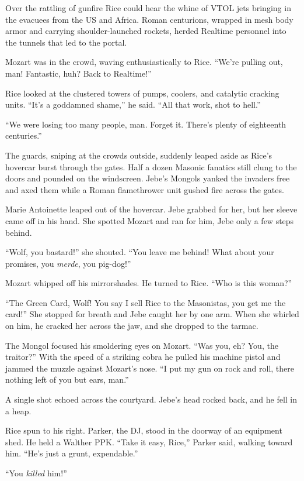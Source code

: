 Over the rattling of gunfire Rice could hear the whine of VTOL jets bringing in the evacuees from the US and Africa. Roman centurions, wrapped in mesh body armor and carrying shoulder-launched rockets, herded Realtime personnel into the tunnels that led to the portal.

Mozart was in the crowd, waving enthusiastically to Rice. ``We're pulling out, man! Fantastic, huh? Back to Realtime!''

Rice looked at the clustered towers of pumps, coolers, and catalytic cracking units. ``It's a goddamned shame,'' he said. ``All that work, shot to hell.''

``We were losing too many people, man. Forget it. There's plenty of eighteenth centuries.''

The guards, sniping at the crowds outside, suddenly leaped aside as Rice's hovercar burst through the gates. Half a dozen Masonic fanatics still clung to the doors and pounded on the windscreen. Jebe's Mongols yanked the invaders free and axed them while a Roman flamethrower unit gushed fire across the gates.

Marie Antoinette leaped out of the hovercar. Jebe grabbed for her, but her sleeve came off in his hand. She spotted Mozart and ran for him, Jebe only a few steps behind.

``Wolf, you bastard!'' she shouted. ``You leave me behind! What about your promises, you \textit{merde}, you pig-dog!''

Mozart whipped off his mirrorshades. He turned to Rice. ``Who is this woman?''

``The Green Card, Wolf! You say I sell Rice to the Masonistas, you get me the card!'' She stopped for breath and Jebe caught her by one arm. When she whirled on him, he cracked her across the jaw, and she dropped to the tarmac.

The Mongol focused his smoldering eyes on Mozart. ``Was you, eh? You, the traitor?'' With the speed of a striking cobra he pulled his machine pistol and jammed the muzzle against Mozart's nose. ``I put my gun on rock and roll, there nothing left of you but ears, man.''

A single shot echoed across the courtyard. Jebe's head rocked back, and he fell in a heap.

Rice spun to his right. Parker, the DJ, stood in the doorway of an equipment shed. He held a Walther PPK. ``Take it easy, Rice,'' Parker said, walking toward him. ``He's just a grunt, expendable.''

``You \textit{killed} him!''


